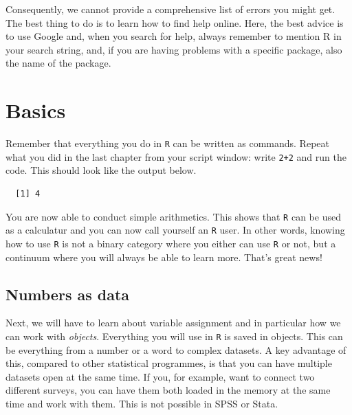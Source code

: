 \documentclass[12pt,oneside]{reedthesis}
\theoremstyle{definition}
\theoremstyle{definition}
\theoremstyle{definition}
\theoremstyle{remark}
\begin{document}
  Consequently, we cannot provide a comprehensive list of errors you might
  get. The best thing to do is to learn how to find help online. Here, the
  best advice is to use Google and, when you search for help, always
  remember to mention R in your search string, and, if you are having
  problems with a specific package, also the name of the package.
  
  \chapter{Basics}\label{basics}
  
  Remember that everything you do in \texttt{R} can be written as
  commands. Repeat what you did in the last chapter from your script
  window: write \texttt{2+2} and run the code. This should look like the
  output below.
  \begin{Shaded}
  \begin{Highlighting}[]
  \OperatorTok{+}
  \end{Highlighting}
  \end{Shaded}
  \begin{verbatim}
  [1] 4
  \end{verbatim}
  You are now able to conduct simple arithmetics. This shows that
  \texttt{R} can be used as a calculatur and you can now call yourself an
  \texttt{R} user. In other words, knowing how to use \texttt{R} is not a
  binary category where you either can use \texttt{R} or not, but a
  continuum where you will always be able to learn more. That's great
  news!
  
  \section{Numbers as data}\label{numbers-as-data}
  
  Next, we will have to learn about variable assignment and in particular
  how we can work with \emph{objects}. Everything you will use in
  \texttt{R} is saved in objects. This can be everything from a number or
  a word to complex datasets. A key advantage of this, compared to other
  statistical programmes, is that you can have multiple datasets open at
  the same time. If you, for example, want to connect two different
  surveys, you can have them both loaded in the memory at the same time
  and work with them. This is not possible in SPSS or Stata.
  
\end{document}

